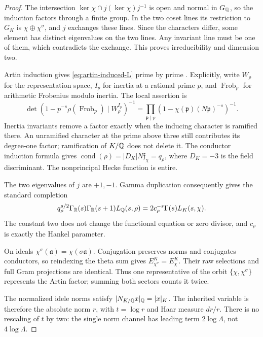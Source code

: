 \begin{proof}
The intersection $\ker\chi\cap j(\ker\chi)j^{-1}$ is open and
normal in $G_\mathbb Q$, so the induction factors through a finite group.
In the two coset lines its restriction to $G_K$ is
$\chi\oplus\chi^\sigma$, and $j$ exchanges these lines.
Since the characters differ, some element has distinct
eigenvalues on the two lines. Any invariant line must be one
of them, which contradicts the exchange. This proves
irreducibility and dimension two.

Artin induction gives \eqref{eq:artin-induced-L} prime by prime
\citep[Theorem~5.10 and Lemma~5.12, pp.~59--61]{horawaLfunctions}.
Explicitly, write $W_\rho$ for the representation space,
$I_p$ for inertia at a rational prime $p$, and
$\operatorname{Frob}_p$ for arithmetic Frobenius modulo inertia.
The local assertion is
\[
 \det(1-p^{-s}\rho(\operatorname{Frob}_p)\mid W_\rho^{I_p})^{-1}
   =\prod_{\mathfrak p\mid p}
                 (1-\chi(\mathfrak p)(N\mathfrak p)^{-s})^{-1}.
\]
Inertia invariants remove a factor exactly when the inducing
character is ramified there. An unramified character at the
prime above three still contributes its degree-one factor;
ramification of $K/\mathbb Q$ does not delete it.
The conductor induction formula
\citep[Proposition~5.58(2), p.~78]{horawaLfunctions} gives
$\operatorname{cond}(\rho)=|D_K|N\mathfrak f_\chi=q_\rho$,
where $D_K=-3$ is the field discriminant.
The nonprincipal Hecke function is entire.

The two eigenvalues of $j$ are $+1,-1$.
Gamma duplication consequently gives the standard completion
\[
 q_\rho^{s/2}\Gamma_\mathbb R(s)\Gamma_\mathbb R(s+1)L_\mathbb Q(s,\rho)
                =2c_\rho^{-s}\Gamma(s)L_K(s,\chi).
\]
The constant two does not change the functional equation or
zero divisor, and $c_\rho$ is exactly the Hankel parameter.

On ideals $\chi^\sigma(\mathfrak a)=\chi(\sigma\mathfrak a)$.
Conjugation preserves norms and conjugates conductors, so
reindexing the theta sum gives $E_{\chi^\sigma}^K=E_\chi^K$.
Their raw selections and full Gram projections are identical.
Thus one representative of the orbit $\{\chi,\chi^\sigma\}$
represents the Artin factor; summing both sectors counts it twice.

The normalized idele norms satisfy
$|N_{K/\mathbb Q}x|_\mathbb Q=|x|_K$. The inherited variable is therefore the
absolute norm $r$, with $t=\log r$ and Haar measure $dr/r$.
There is no rescaling of $t$ by two: the single norm channel
has leading term $2\log\Lambda$, not $4\log\Lambda$.


\end{proof}
